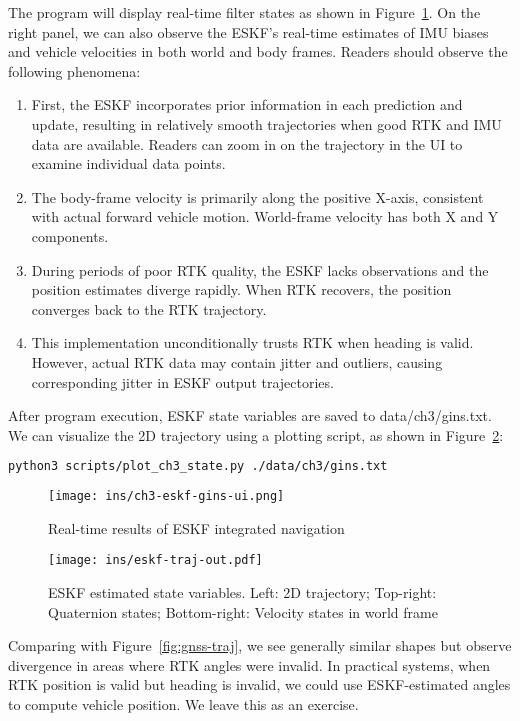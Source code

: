 The program will display real-time filter states as shown in Figure~\ref{fig:ch3-eskf-gins-ui}. On the right panel, we can also observe the ESKF's real-time estimates of IMU biases and vehicle velocities in both world and body frames. Readers should observe the following phenomena:

\begin{enumerate}
\item First, the ESKF incorporates prior information in each prediction and update, resulting in relatively smooth trajectories when good RTK and IMU data are available. Readers can zoom in on the trajectory in the UI to examine individual data points.
\item The body-frame velocity is primarily along the positive X-axis, consistent with actual forward vehicle motion. World-frame velocity has both X and Y components.
\item During periods of poor RTK quality, the ESKF lacks observations and the position estimates diverge rapidly. When RTK recovers, the position converges back to the RTK trajectory.
\item This implementation unconditionally trusts RTK when heading is valid. However, actual RTK data may contain jitter and outliers, causing corresponding jitter in ESKF output trajectories.
\end{enumerate}

After program execution, ESKF state variables are saved to data/ch3/gins.txt. We can visualize the 2D trajectory using a plotting script, as shown in Figure~\ref{fig:eskf-traj}:

\begin{lstlisting}[language=sh,caption=Terminal command:]
python3 scripts/plot_ch3_state.py ./data/ch3/gins.txt
\end{lstlisting}

\begin{figure}
\centering
\texttt{[image: ins/ch3-eskf-gins-ui.png]}
\caption{Real-time results of ESKF integrated navigation}
\label{fig:ch3-eskf-gins-ui}
\end{figure}

\begin{figure}
\centering
\texttt{[image: ins/eskf-traj-out.pdf]}
\caption{ESKF estimated state variables. Left: 2D trajectory; Top-right: Quaternion states; Bottom-right: Velocity states in world frame}
\label{fig:eskf-traj}
\end{figure}

Comparing with Figure~\ref{fig:gnss-traj}, we see generally similar shapes but observe divergence in areas where RTK angles were invalid. In practical systems, when RTK position is valid but heading is invalid, we could use ESKF-estimated angles to compute vehicle position. We leave this as an exercise.

